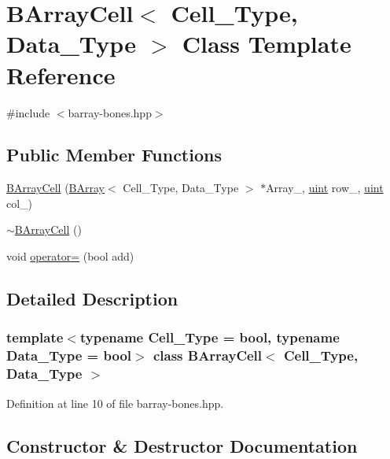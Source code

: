 \hypertarget{class_b_array_cell}{}\section{B\+Array\+Cell$<$ Cell\+\_\+\+Type, Data\+\_\+\+Type $>$ Class Template Reference}
\label{class_b_array_cell}


{\ttfamily \#include $<$barray-\/bones.\+hpp$>$}

\subsection*{Public Member Functions}
\begin{DoxyCompactItemize}
\item 
\hyperlink{class_b_array_cell_a0ebc5e7ef22511ee4a04d737b1fe056c}{B\+Array\+Cell} (\hyperlink{class_b_array}{B\+Array}$<$ Cell\+\_\+\+Type, Data\+\_\+\+Type $>$ $\ast$Array\+\_\+, \hyperlink{typedefs_8hpp_a91ad9478d81a7aaf2593e8d9c3d06a14}{uint} row\+\_\+, \hyperlink{typedefs_8hpp_a91ad9478d81a7aaf2593e8d9c3d06a14}{uint} col\+\_\+)
\item 
\hyperlink{class_b_array_cell_a6fbc56424caade490a72685cc35ad0e9}{$\sim$\+B\+Array\+Cell} ()
\item 
void \hyperlink{class_b_array_cell_a726de4e638ec37b1147d737809765953}{operator=} (bool add)
\end{DoxyCompactItemize}


\subsection{Detailed Description}
\subsubsection*{template$<$typename Cell\+\_\+\+Type = bool, typename Data\+\_\+\+Type = bool$>$\newline
class B\+Array\+Cell$<$ Cell\+\_\+\+Type, Data\+\_\+\+Type $>$}



Definition at line 10 of file barray-\/bones.\+hpp.



\subsection{Constructor \& Destructor Documentation}
\mbox{\label{class_b_array_cell_a0ebc5e7ef22511ee4a04d737b1fe056c}} 
